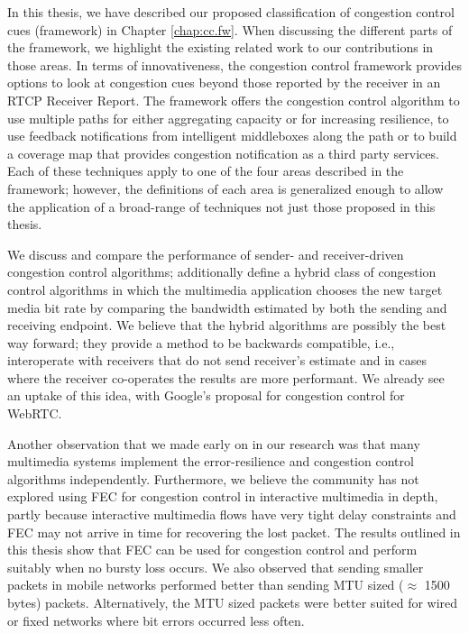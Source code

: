 In this thesis, we have described our proposed classification of congestion
control cues (framework) in Chapter \ref{chap:cc.fw}. When discussing the
different parts of the framework, we highlight the existing related work to
our contributions in those areas. In terms of innovativeness, the congestion
control framework provides options to look at congestion cues beyond those
reported by the receiver in an RTCP Receiver Report. The framework offers the
congestion control algorithm to use multiple paths for either aggregating
capacity or for increasing resilience, to use feedback notifications from
intelligent middleboxes along the path or to build a coverage map that
provides congestion notification as a third party services. Each of these
techniques apply to one of the four areas described in the framework; however,
the definitions of each area is generalized enough to allow the application of
a broad-range of techniques not just those proposed in this thesis.


We discuss and compare the performance of sender- and receiver-driven
congestion control algorithms; additionally define a hybrid class of
congestion control algorithms in which the multimedia application chooses the
new target media bit rate by comparing the bandwidth estimated by both the
sending and receiving endpoint. We believe that the hybrid algorithms are
possibly the best way forward; they provide a method to be backwards
compatible, i.e., interoperate with receivers that do not send receiver’s
estimate and in cases where the receiver co-operates the results are more
performant. We already see an uptake of this idea, with Google’s proposal for
congestion control for WebRTC.

Another observation that we made early on in our research was that many
multimedia systems implement the error-resilience and congestion control
algorithms independently. Furthermore, we believe the community has not
explored using FEC for congestion control in interactive multimedia in depth,
partly because interactive multimedia flows have very tight delay constraints
and FEC may not arrive in time for recovering the lost packet. The results
outlined in this thesis show that FEC can be used for congestion control and
perform suitably when no bursty loss occurs. We also observed that sending
smaller packets in mobile networks performed better than sending MTU sized
($\approx$ 1500 bytes) packets. Alternatively, the MTU sized packets were
better suited for wired or fixed networks where bit errors occurred less
often.


